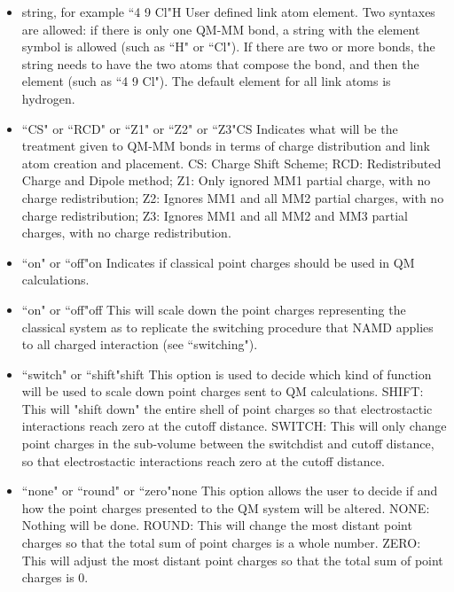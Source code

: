 \begin{itemize}
\item
{}%
{string, for example ``4 9 Cl"}{H}{%
User defined link atom element. Two syntaxes are allowed:
if there is only one QM-MM bond, a string with the element symbol 
is allowed (such as ``H" or ``Cl"). If there are two or more bonds, 
the string needs to have the two atoms that compose the bond, 
and then the element (such as ``4 9 Cl"). 
The default element for all link atoms is hydrogen.
}

\item
{}%
{``CS" or ``RCD" or ``Z1" or ``Z2" or ``Z3"}{CS}{%
Indicates what will be the treatment given to QM-MM bonds in terms 
of charge distribution and link atom creation and placement. 
CS: Charge Shift Scheme; RCD: Redistributed Charge and Dipole method; 
Z1: Only ignored MM1 partial charge, with no charge redistribution; 
Z2: Ignores MM1 and all MM2 partial charges, with no charge redistribution; 
Z3: Ignores MM1 and all MM2 and MM3 partial charges, 
with no charge redistribution.
}

\item
{}%
{``on" or ``off"}{on}{%
Indicates if classical point charges should be used in QM calculations.
}

\item
{}%
{``on" or ``off"}{off}{%
This will scale down the point charges representing the classical 
system as to replicate the switching procedure that NAMD applies 
to all charged interaction (see ``switching").
}

\item
{}%
{``switch" or ``shift"}{shift}{%
This option is used to decide which kind of function will be used 
to scale down point charges sent to QM calculations. 
SHIFT: This will "shift down" the entire shell of point charges 
so that electrostactic interactions reach zero at the cutoff distance. 
SWITCH: This will only change point charges in the sub-volume between 
the switchdist and cutoff distance, so that electrostactic interactions 
reach zero at the cutoff distance.
}

\item
{}%
{``none" or ``round" or ``zero"}{none}{%
This option allows the user to decide if and how the point charges 
presented to the QM system will be altered. NONE: Nothing will be done. 
ROUND: This will change the most distant point charges so that the 
total sum of point charges is a whole number. ZERO: This will adjust 
the most distant point charges so that the total sum of point charges 
is 0.
}


\end{itemize}
